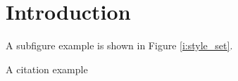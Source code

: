 \chapter{ Introduction}
\label{c:intro}

A subfigure example is shown in Figure \ref{i:style_set}.


 A citation example \cite{styleVideo} 

